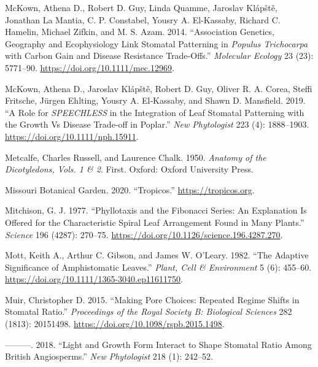\documentclass[
  12pt,
]{article}
\newlength{\cslhangindent}
\newlength{\cslentryspacingunit} %
\newenvironment{CSLReferences}[2] %
 {%
  \setlength{\parindent}{0pt}
  \ifodd #1
  \let\oldpar\par
  \def\par{\hangindent=\cslhangindent\oldpar}
  \fi
  \setlength{\parskip}{#2\cslentryspacingunit}
 }%
 {}
\begin{document}
\begin{CSLReferences}{1}{0}
\leavevmode{}%
McKown, Athena D., Robert D. Guy, Linda Quamme, Jaroslav Klápště, Jonathan La Mantia, C. P. Constabel, Yousry A. El-Kassaby, Richard C. Hamelin, Michael Zifkin, and M. S. Azam. 2014. {``Association Genetics, Geography and Ecophysiology Link Stomatal Patterning in \emph{{Populus} Trichocarpa} with Carbon Gain and Disease Resistance Trade-Offs.''} \emph{Molecular Ecology} 23 (23): 5771--90. \url{https://doi.org/10.1111/mec.12969}.

\leavevmode{}%
McKown, Athena D., Jaroslav Klápště, Robert D. Guy, Oliver R. A. Corea, Steffi Fritsche, Jürgen Ehlting, Yousry A. El‐Kassaby, and Shawn D. Mansfield. 2019. {``A Role for \emph{SPEECHLESS} in the Integration of Leaf Stomatal Patterning with the Growth Vs Disease Trade‐off in Poplar.''} \emph{New Phytologist} 223 (4): 1888--1903. \url{https://doi.org/10.1111/nph.15911}.

\leavevmode{}%
Metcalfe, Charles Russell, and Laurence Chalk. 1950. \emph{Anatomy of the Dicotyledons, {Vols}. 1 \& 2}. First. Oxford: Oxford University Press.

\leavevmode{}%
Missouri Botanical Garden. 2020. {``Tropicos.''} \url{https://tropicos.org}.

\leavevmode{}%
Mitchison, G. J. 1977. {``Phyllotaxis and the {Fibonacci} {Series}: {An} Explanation Is Offered for the Characteristic Spiral Leaf Arrangement Found in Many Plants.''} \emph{Science} 196 (4287): 270--75. \url{https://doi.org/10.1126/science.196.4287.270}.

\leavevmode{}%
Mott, Keith A., Arthur C. Gibson, and James W. O'Leary. 1982. {``The Adaptive Significance of Amphistomatic Leaves.''} \emph{Plant, Cell \& Environment} 5 (6): 455--60. \url{https://doi.org/10.1111/1365-3040.ep11611750}.

\leavevmode{}%
Muir, Christopher D. 2015. {``Making Pore Choices: Repeated Regime Shifts in Stomatal Ratio.''} \emph{Proceedings of the Royal Society B: Biological Sciences} 282 (1813): 20151498. \url{https://doi.org/10.1098/rspb.2015.1498}.

\leavevmode{}%
---------. 2018. {``Light and Growth Form Interact to Shape Stomatal Ratio Among {British} Angiosperms.''} \emph{New Phytologist} 218 (1): 242--52.


\end{CSLReferences}
\end{document}
